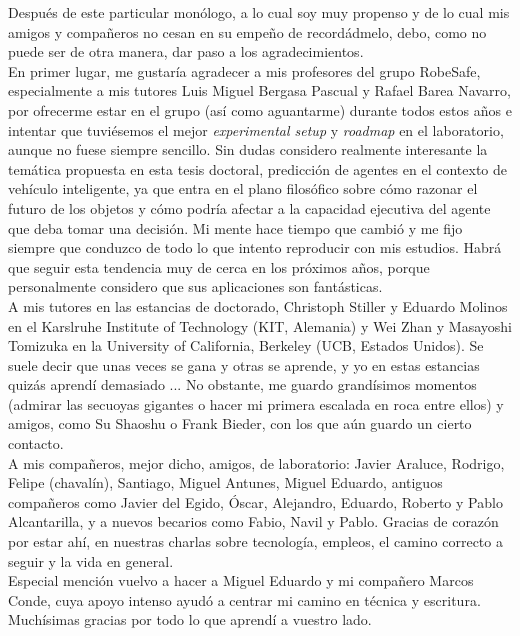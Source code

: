 Después de este particular monólogo, a lo cual soy muy propenso y de lo cual mis amigos y compañeros no cesan en su empeño de recordádmelo, debo, como no puede ser de otra manera, dar paso a los agradecimientos. \\

En primer lugar, me gustaría agradecer a mis profesores del grupo RobeSafe, especialmente a mis tutores Luis Miguel Bergasa Pascual y Rafael Barea Navarro, por ofrecerme estar en el grupo (así como aguantarme) durante todos estos años e intentar que tuviésemos el mejor \textit{experimental setup} y \textit{roadmap} en el laboratorio, aunque no fuese siempre sencillo. Sin dudas considero realmente interesante la temática propuesta en esta tesis doctoral, predicción de agentes en el contexto de vehículo inteligente, ya que entra en el plano filosófico sobre cómo razonar el futuro de los objetos y cómo podría afectar a la capacidad ejecutiva del agente que deba tomar una decisión. Mi mente hace tiempo que cambió y me fijo siempre que conduzco de todo lo que intento reproducir con mis estudios. Habrá que seguir esta tendencia muy de cerca en los próximos años, porque personalmente considero que sus aplicaciones son fantásticas. \\

A mis tutores en las estancias de doctorado, Christoph Stiller y Eduardo Molinos en el Karslruhe Institute of Technology (KIT, Alemania) y Wei Zhan y Masayoshi Tomizuka en la University of California, Berkeley (UCB, Estados Unidos). Se suele decir que unas veces se gana y otras se aprende, y yo en estas estancias quizás aprendí demasiado ... No obstante, me guardo grandísimos momentos (admirar las secuoyas gigantes o hacer mi primera escalada en roca entre ellos) y amigos, como Su Shaoshu o Frank Bieder, con los que aún guardo un cierto contacto. \\

A mis compañeros, mejor dicho, amigos, de laboratorio: Javier Araluce, Rodrigo, Felipe (chavalín), Santiago, Miguel Antunes, Miguel Eduardo,
antiguos compañeros como Javier del Egido, Óscar, Alejandro, Eduardo, Roberto y Pablo Alcantarilla, y a nuevos becarios como Fabio, Navil y Pablo. Gracias de corazón por estar ahí, en nuestras charlas sobre tecnología, empleos, el camino correcto a seguir y la vida en general. \\

Especial mención vuelvo a hacer a Miguel Eduardo y mi compañero Marcos Conde, cuya apoyo intenso ayudó a centrar mi camino en técnica y escritura. Muchísimas gracias por todo lo que aprendí a vuestro lado. \\

